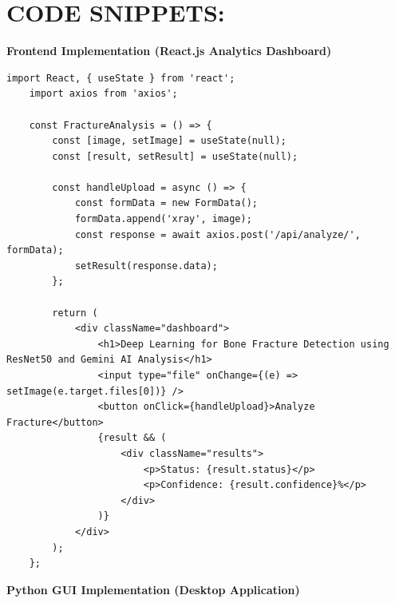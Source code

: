 \documentclass[a4paper,12pt]{report}
\begin{document}
    \section*{CODE SNIPPETS:}
    \textbf{Frontend Implementation (React.js Analytics Dashboard)}\\[5pt]

    \begin{lstlisting}[style=pythonstyle]
    import React, { useState } from 'react';
    import axios from 'axios';

    const FractureAnalysis = () => {
        const [image, setImage] = useState(null);
        const [result, setResult] = useState(null);

        const handleUpload = async () => {
            const formData = new FormData();
            formData.append('xray', image);
            const response = await axios.post('/api/analyze/', formData);
            setResult(response.data);
        };

        return (
            <div className="dashboard">
                <h1>Deep Learning for Bone Fracture Detection using ResNet50 and Gemini AI Analysis</h1>
                <input type="file" onChange={(e) => setImage(e.target.files[0])} />
                <button onClick={handleUpload}>Analyze Fracture</button>
                {result && (
                    <div className="results">
                        <p>Status: {result.status}</p>
                        <p>Confidence: {result.confidence}%</p>
                    </div>
                )}
            </div>
        );
    };
    \end{lstlisting}

    \vspace{2em}
    \textbf{Python GUI Implementation (Desktop Application)}\\[5pt]
\end{document}
